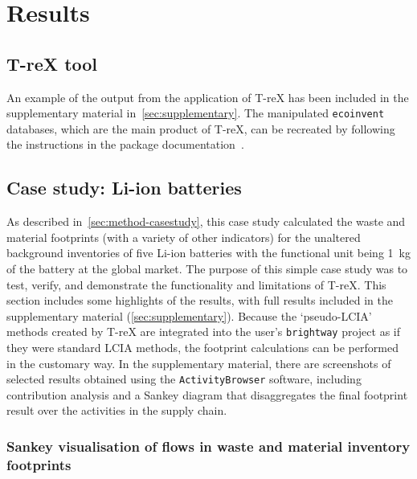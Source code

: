 \documentclass[a4paper,fleqn]{cas-dc}
\begin{document}
\section{Results}\label{sec:results}
\subsection{T-reX tool}\label{sec:results-T-reX}

An example of the output from the application of T-reX has been included in the supplementary material in~\autoref{sec:supplementary}. The manipulated \texttt{ecoinvent} databases, which are the main product of T-reX, can be recreated by following the instructions in the package documentation~\citep{mcdowall2023T-reXdocs}.

\subsection{Case study: Li-ion batteries}\label{sec:results-casestudy}

As described in~\autoref{sec:method-casestudy}, this case study calculated the waste and material footprints (with a variety of other indicators) for the unaltered background inventories of five Li-ion batteries with the functional unit being 1~kg of the battery at the global market. The purpose of this simple case study was to test, verify, and demonstrate the functionality and limitations of T-reX. This section includes some highlights of the results, with full results included in the supplementary material (\autoref{sec:supplementary}). Because the `pseudo-LCIA' methods created by T-reX are integrated into the user's \texttt{brightway} project as if they were standard LCIA methods, the footprint calculations can be performed in the customary way. In the supplementary material, there are screenshots of selected results obtained using the \texttt{ActivityBrowser} software, including contribution analysis and a Sankey diagram that disaggregates the final footprint result over the activities in the supply chain.

\subsubsection{Sankey visualisation of flows in waste and material inventory footprints}\label{sec:results-case_study-sankey}
\end{document}
